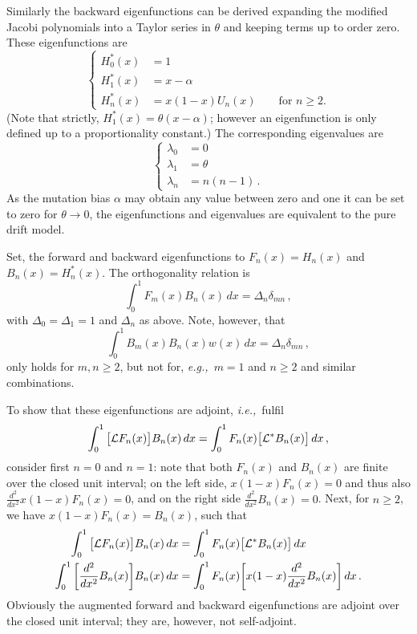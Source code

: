 \documentclass[preprint]{elsarticle}
\newcommand\eg{{\it e.g.,}}
\newcommand\ie{{\it i.e.,}}
\begin{document}
Similarly the backward eigenfunctions can be derived expanding the modified Jacobi polynomials into a Taylor series in $\theta$ and keeping terms up to order zero. These eigenfunctions are
\begin{equation}\label{eq:backw_Us}
\begin{cases}
    H_0^{*}(x)&=1\\
    H_1^{*}(x)&=x-\alpha\\
    H_n^{*}(x)&=x(1-x)U_n(x) \qquad\text{for $n\geq 2$}.
\end{cases}
\end{equation}
(Note that strictly, $H_1^{*}(x)=\theta(x-\alpha)$; however an eigenfunction is only defined up to a proportionality constant.) The corresponding eigenvalues are 
\begin{equation}\label{eq:bound_mut_ev}
\begin{cases}
    \lambda_0&=0\\
    \lambda_1&=\theta\\
    \lambda_n&=n(n-1)\,.
\end{cases}
\end{equation}
As the mutation bias $\alpha$ may obtain any value between zero and one it can be set to zero for $\theta\to0$, the eigenfunctions and eigenvalues are equivalent to the pure drift model. 

Set, the forward and backward eigenfunctions to $F_n(x)=H_n(x)$ and $B_n(x)=H_n^*(x)$. The orthogonality relation is
\begin{equation}\label{eq:ortho_rel_pure_drift}
\int_0^1 F_m(x) B_n(x)\,dx=\Delta_n \delta_{mn}\,,
\end{equation}
with $\Delta_0=\Delta_1=1$ and $\Delta_n$ as above. Note, however, that 
\begin{equation}
\int_0^1 B_m(x) B_n(x) w(x) \,dx=\Delta_n \delta_{mn}\,,
\end{equation}
only holds for $m,n\geq 2$, but not for, \eg\ $m=1$ and $n\geq 2$ and similar combinations. 

To show that these eigenfunctions are adjoint, \ie\ fulfil
\begin{equation}\label{eq:adjoint_pure_drift}
\int_{0}^{1} \big[{\cal L} F_n(x)\big] B_n(x)\,dx=
\int_{0}^{1} F_n(x) \big[{\cal L}^{*} B_n(x)\big]\,dx\,,
\end{equation}
consider first $n=0$ and $n=1$: note that both $F_n(x)$ and $B_n(x)$ are finite over the closed unit interval; on the left side, $x(1-x)F_n(x)=0$ and thus also $\frac{d^2}{dx^2}x(1-x)F_n(x)=0$, and on the right side $\frac{d^2}{dx^2}B_n(x)=0$. Next, for $n\geq 2$, we have $x(1-x)F_n(x)=B_n(x)$, such that
\begin{equation}
\begin{split}
\int_{0}^{1} \big[{\cal L} F_n(x)\big] B_n(x)\,dx&=
\int_{0}^{1} F_n(x) \big[{\cal L}^{*} B_n(x)\big]\,dx\\
\int_{0}^{1} \bigg[\frac{d^2}{dx^2} B_n(x)\bigg] B_n(x)\,dx&=
\int_{0}^{1} F_n(x) \bigg[ x(1-x) \frac{d^2}{dx^2} B_n(x)\bigg]\,dx\,.
\end{split}
\end{equation}
Obviously the augmented forward and backward eigenfunctions are adjoint over the closed unit interval; they are, however, not self-adjoint.
\end{document}
